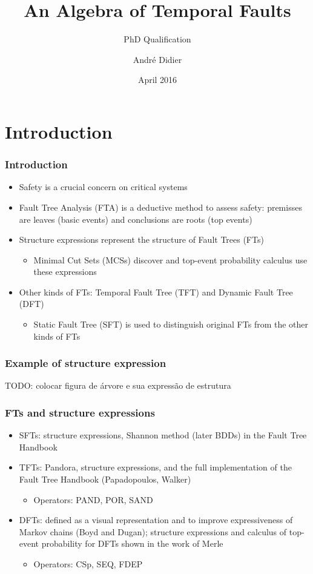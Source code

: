 \documentclass{beamer}
\title{An Algebra of Temporal Faults}
\subtitle{PhD Qualification}
\date{April 2016}
\author{André Didier}
\institute{
\inst{1}Federal University of Pernambuco\\
Centre of Informatics
}
\def\FTA{Fault Tree Analysis (FTA)\gdef\FTA{FTA\xspace}\xspace}
\def\FT{%
	Fault Tree (FT)%
	\gdef\FT{FT\xspace}%
	\gdef\FTs{FTs\xspace}%
	\xspace%
}
\def\FTs{%
	Fault Trees (FTs)%
	\gdef\FT{FT\xspace}%
	\gdef\FTs{FTs\xspace}%
	\xspace%
}
\def\MCS{%
	Minimal Cut Set (MCS)%
	\gdef\MCS{MCS\xspace}%
	\gdef\MCSs{MCSs\xspace}%
	\xspace%
}
\def\MCSs{%
	Minimal Cut Sets (MCSs)%
	\gdef\MCS{MCS\xspace}%
	\gdef\MCSs{MCSs\xspace}%
	\xspace%
}
\def\SFT{%
	Static Fault Tree (SFT)%
	\gdef\SFT{SFT\xspace}%
	\gdef\SFTs{SFTs\xspace}%
	\xspace%
}
\def\SFTs{%
	Static Fault Trees (SFTs)%
	\gdef\SFT{SFT\xspace}%
	\gdef\SFTs{SFTs\xspace}%
	\xspace%
}
\def\TFT{%
	Temporal Fault Tree (TFT)%
	\gdef\TFT{TFT\xspace}%
	\gdef\TFTs{TFTs\xspace}%
	\xspace%
}
\def\TFTs{%
	Temporal Fault Trees (TFTs)%
	\gdef\TFT{TFT\xspace}%
	\gdef\TFTs{TFTs\xspace}%
	\xspace%
}
\def\DFT{%
	Dynamic Fault Tree (DFT)%
	\gdef\DFT{DFT\xspace}%
	\gdef\DFTs{DFTs\xspace}%
	\xspace%
}
\def\DFTs{%
	Dynamic Fault Trees (DFTs)%
	\gdef\DFT{DFT\xspace}%
	\gdef\DFTs{DFTs\xspace}%
	\xspace%
}
\begin{document}
\begin{frame}[label=title]
\titlepage
\end{frame}

\section{Introduction}
\begin{frame}
	\frametitle{Introduction}
	\begin{itemize}
		\item Safety is a crucial concern on critical systems
		\item \FTA is a deductive method to assess safety: premisses are leaves (basic events) and conclusions are roots (top events)
		\item Structure expressions represent the structure of \FTs
		\begin{itemize}
			\item \MCSs discover and top-event probability calculus use these expressions
		\end{itemize}
		\item Other kinds of \FTs: \TFT and \DFT
		\begin{itemize}
			\item \SFT is used to distinguish original \FTs from the other kinds of \FTs
		\end{itemize}
	\end{itemize}
\end{frame}

\begin{frame}
	\frametitle{Example of structure expression}
	TODO: colocar figura de árvore e sua expressão de estrutura
\end{frame}

\begin{frame}
	\frametitle{\FTs and structure expressions}
	\begin{itemize}
		\item \SFTs: structure expressions, Shannon method (later BDDs) in the Fault Tree Handbook
		\item \TFTs: Pandora, structure expressions, and the full implementation of the Fault Tree Handbook (Papadopoulos, Walker)
		\begin{itemize}
			\item Operators: PAND, POR, SAND
		\end{itemize}
		\item \DFTs: defined as a visual representation and to improve expressiveness of Markov chains (Boyd and Dugan); structure expressions and calculus of top-event probability for \DFTs shown in the work of Merle
		\begin{itemize}
			\item Operators: CSp, SEQ, FDEP
		\end{itemize}
	\end{itemize}
\end{frame}
\end{document}
